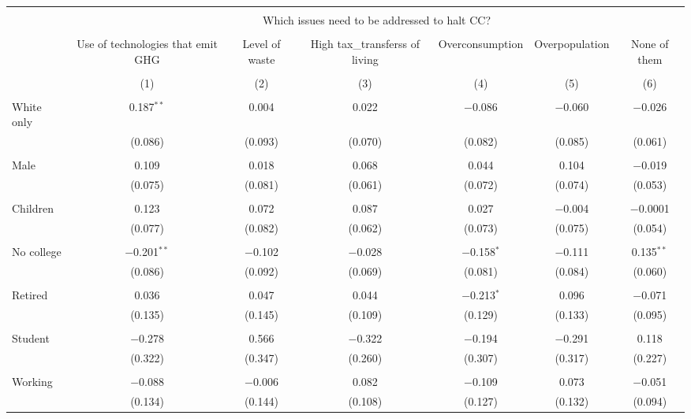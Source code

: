 
\begin{tabular}{@{\extracolsep{5pt}}lcccccc} 
\\[-1.8ex]\hline 
\hline \\[-1.8ex] 
 & \multicolumn{6}{c}{Which issues need to be addressed to halt CC?} \\ 
\cline{2-7} 
\\[-1.8ex] & Use of technologies that emit GHG & Level of waste & High tax_transferss of living & Overconsumption & Overpopulation & None of them \\ 
\\[-1.8ex] & (1) & (2) & (3) & (4) & (5) & (6)\\ 
\hline \\[-1.8ex] 
 White only & 0.187$^{**}$ & 0.004 & 0.022 & $-$0.086 & $-$0.060 & $-$0.026 \\ 
  & (0.086) & (0.093) & (0.070) & (0.082) & (0.085) & (0.061) \\ 
  & & & & & & \\ 
 Male & 0.109 & 0.018 & 0.068 & 0.044 & 0.104 & $-$0.019 \\ 
  & (0.075) & (0.081) & (0.061) & (0.072) & (0.074) & (0.053) \\ 
  & & & & & & \\ 
 Children & 0.123 & 0.072 & 0.087 & 0.027 & $-$0.004 & $-$0.0001 \\ 
  & (0.077) & (0.082) & (0.062) & (0.073) & (0.075) & (0.054) \\ 
  & & & & & & \\ 
 No college & $-$0.201$^{**}$ & $-$0.102 & $-$0.028 & $-$0.158$^{*}$ & $-$0.111 & 0.135$^{**}$ \\ 
  & (0.086) & (0.092) & (0.069) & (0.081) & (0.084) & (0.060) \\ 
  & & & & & & \\ 
 Retired & 0.036 & 0.047 & 0.044 & $-$0.213$^{*}$ & 0.096 & $-$0.071 \\ 
  & (0.135) & (0.145) & (0.109) & (0.129) & (0.133) & (0.095) \\ 
  & & & & & & \\ 
 Student & $-$0.278 & 0.566 & $-$0.322 & $-$0.194 & $-$0.291 & 0.118 \\ 
  & (0.322) & (0.347) & (0.260) & (0.307) & (0.317) & (0.227) \\ 
  & & & & & & \\ 
 Working & $-$0.088 & $-$0.006 & 0.082 & $-$0.109 & 0.073 & $-$0.051 \\ 
  & (0.134) & (0.144) & (0.108) & (0.127) & (0.132) & (0.094) \\ 

\end{tabular}
